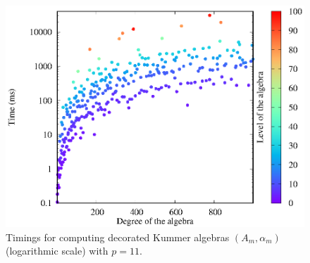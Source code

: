 \begin{figure}
  \centering
  \includegraphics{benchmarks/lattice-h90/solve-h90-11.eps}
  \caption{Timings for computing decorated Kummer algebras $(A_m, \alpha_m)$ (logarithmic scale)
  with $p=11$.}
  \label{fig:solve-h90-11}
\end{figure}

%
